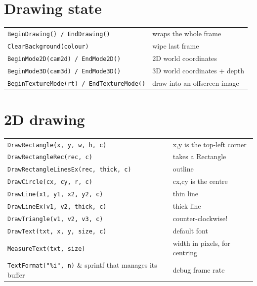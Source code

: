 \section{Drawing state}

\begin{center}
\begin{tabular}{@{}ll@{}}
\toprule
\lstinline|BeginDrawing() / EndDrawing()| & wraps the whole frame \\
\lstinline|ClearBackground(colour)| & wipe last frame \\
\lstinline|BeginMode2D(cam2d) / EndMode2D()| & 2D world coordinates \\
\lstinline|BeginMode3D(cam3d) / EndMode3D()| & 3D world coordinates + depth \\
\lstinline|BeginTextureMode(rt) / EndTextureMode()| & draw into an offscreen image \\
\bottomrule
\end{tabular}
\end{center}

\section{2D drawing}

\begin{center}
\begin{tabular}{@{}ll@{}}
\toprule
\lstinline|DrawRectangle(x, y, w, h, c)| & x,y is the top-left corner \\
\lstinline|DrawRectangleRec(rec, c)| & takes a Rectangle \\
\lstinline|DrawRectangleLinesEx(rec, thick, c)| & outline \\
\lstinline|DrawCircle(cx, cy, r, c)| & cx,cy is the centre \\
\lstinline|DrawLine(x1, y1, x2, y2, c)| & thin line \\
\lstinline|DrawLineEx(v1, v2, thick, c)| & thick line \\
\lstinline|DrawTriangle(v1, v2, v3, c)| & counter-clockwise! \\
\lstinline|DrawText(txt, x, y, size, c)| & default font \\
\lstinline|MeasureText(txt, size)| & width in pixels, for centring \\
\lstinline|TextFormat("%i", n)| & sprintf that manages its buffer \\
\lstinline|DrawFPS(x, y)| & debug frame rate \\
\bottomrule
\end{tabular}
\end{center}

